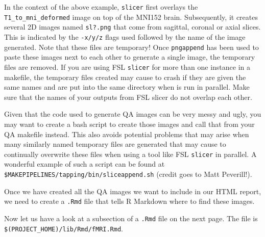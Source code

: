 In the context of the above example, \texttt{slicer} first overlays the \texttt{T1_to_mni_deformed} image on top of the MNI152 brain. Subsequently, it creates several 2D images named \texttt{sl?.png} that come from sagittal, coronal or axial slices. This is indicated by the \texttt{-x/y/z} flags used followed by the name of the image generated. Note that these files are temporary! Once \texttt{pngappend} has been used to paste these images next to each other to generate a single image, the temporary files are removed. If you are using FSL \texttt{slicer} for more than one instance in a makefile, the temporary files created may cause \maken{} to crash if they are given the same names and are put into the same directory when \maken{} is run in parallel. Make sure that the names of your outputs from FSL slicer do not overlap each other. 

Given that the code used to generate QA images can be very messy and ugly, you may want to create a bash script to create those images and call that from your QA makefile instead. This also avoids potential problems that may arise when many similarly named temporary files are generated that may cause \maken{} to continually overwrite these files when using a tool like FSL \texttt{slicer} in parallel. A wonderful example of such a script can be found at \texttt{\$MAKEPIPELINES/tapping/bin/sliceappend.sh} (credit goes to Matt Peverill!). 

Once we have created all the QA images we want to include in our HTML report, we need to create a \texttt{.Rmd} file that tells R Markdown where to find these images. 

Now let us have a look at a subsection of a \texttt{.Rmd} file on the next page. The file is \texttt{\$(PROJECT\_HOME)/lib/Rmd/fMRI.Rmd}. 

